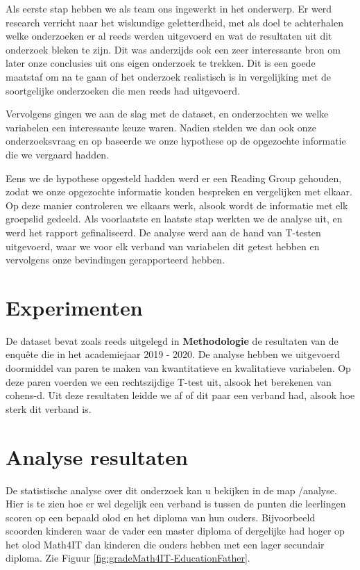 \documentclass{hogent-article}
\begin{document}
Als eerste stap hebben we als team ons ingewerkt in het onderwerp. Er werd research verricht naar het wiskundige geletterdheid, met als doel te achterhalen welke onderzoeken er al reeds werden uitgevoerd en wat de resultaten uit dit onderzoek bleken te zijn. Dit was anderzijds ook een zeer interessante bron om later onze conclusies uit ons eigen onderzoek te trekken. Dit is een goede maatstaf om na te gaan of het onderzoek realistisch is in vergelijking met de soortgelijke onderzoeken die men reeds had uitgevoerd.

Vervolgens gingen we aan de slag met de dataset, en onderzochten we welke variabelen een interessante keuze waren. Nadien stelden we dan ook onze onderzoeksvraag en op baseerde we onze hypothese op de opgezochte informatie die we vergaard hadden.

Eens we de hypothese opgesteld hadden werd er een Reading Group gehouden, zodat we onze opgezochte informatie konden bespreken en vergelijken met elkaar. Op deze manier controleren we elkaars werk, alsook wordt de informatie met elk groepslid gedeeld. Als voorlaatste en laatste stap werkten we de analyse uit, en werd het rapport gefinaliseerd. De analyse werd aan de hand van T-testen uitgevoerd, waar we voor elk verband van variabelen dit getest hebben en vervolgens onze bevindingen gerapporteerd hebben. 


\section{Experimenten}
De dataset bevat zoals reeds uitgelegd in \textbf{Methodologie } de resultaten van de enquête die in het academiejaar 2019 - 2020. De analyse hebben we uitgevoerd doormiddel van paren te maken van kwantitatieve en kwalitatieve variabelen. Op deze paren voerden we een rechtszijdige T-test uit, alsook het berekenen van cohens-d. Uit deze resultaten leidde we af of dit paar een verband had, alsook hoe sterk dit verband is.


\section{Analyse resultaten}

De statistische analyse over dit onderzoek kan u bekijken in de map /analyse.
Hier is te zien hoe er wel degelijk een verband is tussen de punten die leerlingen scoren op een bepaald olod en het diploma van hun ouders. Bijvoorbeeld scoorden kinderen waar de vader een master diploma of dergelijke had hoger op het olod Math4IT dan kinderen die ouders hebben met een lager secundair diploma. Zie Figuur \ref{fig:gradeMath4IT-EducationFather}.
\end{document}
